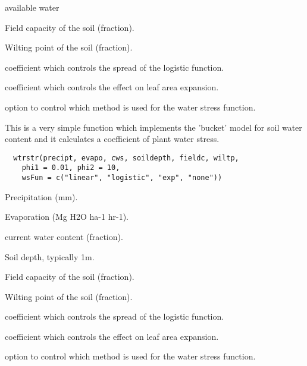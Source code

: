 \documentclass[letterpaper]{book}
\begin{document}
%
\begin{Arguments}
\begin{ldescription}
\item[\code{aw}] available water

\item[\code{fieldc}] Field capacity of the soil (fraction).

\item[\code{wiltp}] Wilting point of the soil (fraction).

\item[\code{phi1}] coefficient which controls the spread of the
logistic function.

\item[\code{phi2}] coefficient which controls the effect on leaf
area expansion.

\item[\code{wsFun}] option to control which method is used for
the water stress function.
\end{ldescription}
\end{Arguments}
%
\begin{Description}\relax
This is a very simple function which implements the
'bucket' model for soil water content and it calculates a
coefficient of plant water stress.
\end{Description}
%
\begin{Usage}
\begin{verbatim}
  wtrstr(precipt, evapo, cws, soildepth, fieldc, wiltp,
    phi1 = 0.01, phi2 = 10,
    wsFun = c("linear", "logistic", "exp", "none"))
\end{verbatim}
\end{Usage}
%
\begin{Arguments}
\begin{ldescription}
\item[\code{precipt}] Precipitation (mm).

\item[\code{evapo}] Evaporation (Mg H2O ha-1 hr-1).

\item[\code{cws}] current water content (fraction).

\item[\code{soildepth}] Soil depth, typically 1m.

\item[\code{fieldc}] Field capacity of the soil (fraction).

\item[\code{wiltp}] Wilting point of the soil (fraction).

\item[\code{phi1}] coefficient which controls the spread of the
logistic function.

\item[\code{phi2}] coefficient which controls the effect on leaf
area expansion.

\item[\code{wsFun}] option to control which method is used for
the water stress function.
\end{ldescription}
\end{Arguments}
\end{document}
